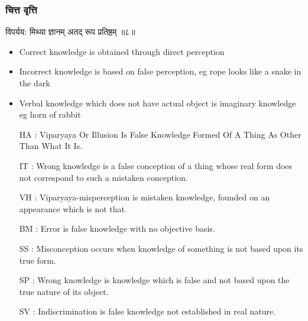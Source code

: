 \begin{frame}[fragile]\frametitle{चित्त वृत्ति}

\begin{sanskrit}
विपर्यय: मिथ्या ज्ञानम् अतद् रूप प्रतिष्ठम् ॥८॥
\end{sanskrit}


	\begin{itemize}
	\item Correct knowledge is obtained through direct perception
	\item Incorrect knowledge is based on false perception, eg rope looks like a snake in the dark
	\item Verbal knowledge which does not have actual object is imaginary knowledge eg horn of rabbit
	\item [HA]: Viparyaya Or Illusion Is False Knowledge Formed Of A Thing As Other Than What It Is.
	\item [IT]: Wrong knowledge is a false conception of a thing whose real form does not correspond to such a mistaken conception.
	\item [VH]: Viparyaya-misperception is mistaken knowledge, founded on an appearance which is not that.
	\item [BM]: Error is false knowledge with no objective basis.
	\item [SS]: Misconception occurs when knowledge of something is not based upon its true form.
	\item [SP]: Wrong knowledge is knowledge which is false and not based upon the true nature of its object.
	\item [SV]: Indiscrimination is false knowledge not established in real nature.
	\end{itemize}

\end{frame}

